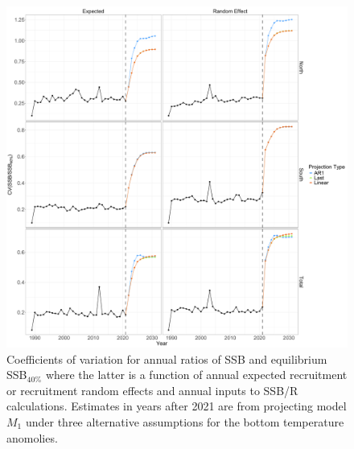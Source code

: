 \documentclass[
]{article}
\begin{document}
\begin{figure}

{\centering \includegraphics[height=0.95\textheight]{proj_SSB_status_CV} 

}

\caption{Coefficients of variation for annual ratios of SSB and equilibrium SSB$_{40\%}$ where the latter is a function of annual expected recruitment or recruitment random effects and annual inputs to SSB/R calculations. Estimates in years after 2021 are from projecting model $M_1$ under three alternative assumptions for the bottom temperature anomolies.}\label{fig:annual-SSB-status-cvs}
\end{figure}
\end{document}
